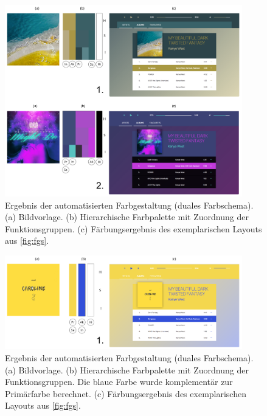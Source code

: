 \begin{figure}[h]
\centering
\includegraphics[width=0.92\textwidth]{img/results_dual.png}
\caption{Ergebnis der automatisierten Farbgestaltung (duales Farbschema). (a) Bildvorlage. (b) Hierarchische Farbpalette mit Zuordnung der Funktionsgruppen. (c) Färbungsergebnis des exemplarischen Layouts aus \autoref{fig:fgs}.}
\label{fig:results_dual}
\end{figure}

\begin{figure}[h]
\centering
\includegraphics[width=0.92\textwidth]{img/results_monochrom.png}
\caption{Ergebnis der automatisierten Farbgestaltung (duales Farbschema). (a) Bildvorlage. (b) Hierarchische Farbpalette mit Zuordnung der Funktionsgruppen.  Die blaue Farbe wurde komplementär zur Primärfarbe berechnet. (c) Färbungsergebnis des exemplarischen Layouts aus \autoref{fig:fgs}.}
\label{fig:results_monochrom}
\end{figure}

